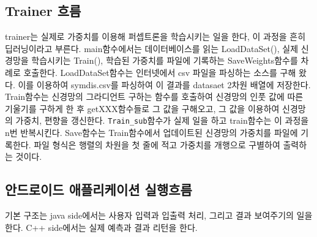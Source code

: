 \documentclass{report}
\begin{document}
\subsection{Trainer 흐름}
trainer는 실제로 가중치를 이용해 퍼셉트론을 학습시키는 일을 한다, 이 과정을 흔히 딥러닝이라고 부른다. main함수에서는 데이터베이스를 읽는 LoadDataSet(), 실제 신경망을 학습시키는 Train(), 학습된 가중치를 파일에 기록하는 SaveWeights함수를 차례로 호출한다.
LoadDataSet함수는 인터넷에서 csv 파일을 파싱하는 소스를 구해 왔다. 이를 이용하여  symdis.csv를 파싱하여 이 결과를 datasaet 2차원 배열에 저장한다.
Train함수는 신경망의 그라디언트 구하는 함수를 호출하여 신경망의 인풋 값에 따른 기울기를 구하게 한 후 getXXX함수들로 그 값을 구해오고, 그 값을 이용하여 신경망의 가중치, 편향을  갱신한다. \lstinline{Train_sub}함수가 실제 일을 하고 train함수는 이 과정을 n번 반복시킨다.
Save함수는 Train함수에서 업데이트된 신경망의 가중치를 파일에 기록한다. 파일 형식은 행렬의 차원을 첫 줄에 적고 가중치를 개행으로 구별하여 출력하는 것이다.

\subsection{안드로이드 애플리케이션 실행흐름}
기본 구조는 java side에서는 사용자 입력과 입출력 처리, 그리고 결과 보여주기의 일을 한다.
C++ side에서는 실제 예측과 결과 리턴을 한다.
\end{document}
